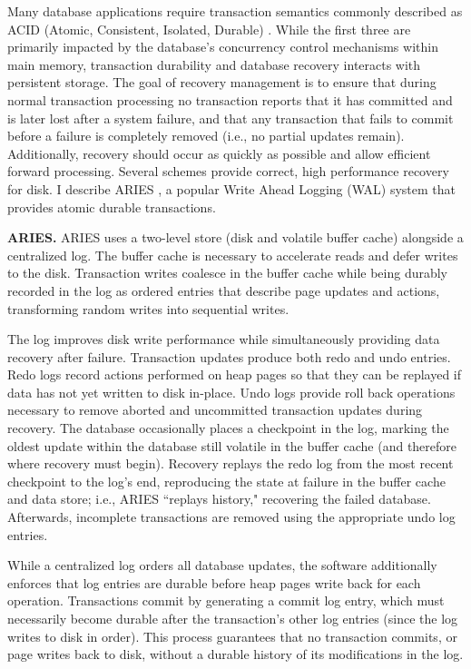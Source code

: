 Many database applications require transaction semantics commonly described as ACID (Atomic, Consistent, Isolated, Durable) \cite{Gray81}.
While the first three are primarily impacted by the database's concurrency control mechanisms within main memory, transaction durability and database recovery interacts with persistent storage.
The goal of recovery management is to ensure that during normal transaction processing no transaction reports that it has committed and is later lost after a system failure, and that any transaction that fails to commit before a failure is completely removed (i.e., no partial updates remain).
Additionally, recovery should occur as quickly as possible and allow efficient forward processing.
Several schemes provide correct, high performance recovery for disk.
I describe ARIES \cite{MohanHaderle92}, a popular Write Ahead Logging (WAL) system that provides atomic durable transactions.

\textbf{ARIES.}
ARIES uses a two-level store (disk and volatile buffer cache) alongside a centralized log.
The buffer cache is necessary to accelerate reads and defer writes to the disk.
Transaction writes coalesce in the buffer cache while being durably recorded in the log as ordered entries that describe page updates and actions, transforming random writes into sequential writes.

The log improves disk write performance while simultaneously providing data recovery after failure.
Transaction updates produce both redo and undo entries.
Redo logs record actions performed on heap pages so that they can be replayed if data has not yet written to disk in-place.
Undo logs provide roll back operations necessary to remove aborted and uncommitted transaction updates during recovery.
The database occasionally places a checkpoint in the log, marking the oldest update within the database still volatile in the buffer cache (and therefore where recovery must begin).
Recovery replays the redo log from the most recent checkpoint to the log's end, reproducing the state at failure in the buffer cache and data store; i.e., ARIES ``replays history," recovering the failed database.
Afterwards, incomplete transactions are removed using the appropriate undo log entries.

While a centralized log orders all database updates, the software additionally enforces that log entries are durable before heap pages write back for each operation.
Transactions commit by generating a commit log entry, which must necessarily become durable after the transaction's other log entries (since the log writes to disk in order).
This process guarantees that no transaction commits, or page writes back to disk, without a durable history of its modifications in the log.

